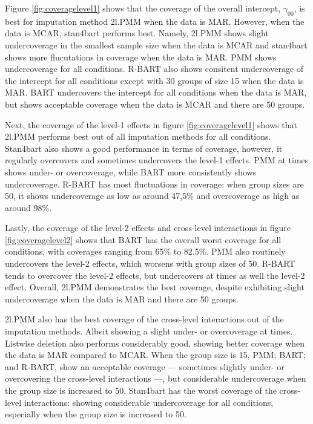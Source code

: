 \documentclass[3p,12pt,a4paper]{elsarticle}
\begin{document}
Figure \ref{fig:coveragelevel1} shows that the coverage of the overall intercept, $\gamma_{00}$, is best for imputation method 2l.PMM when the data is MAR. However, when the data is MCAR, stan4bart performs best. Namely, 2l.PMM shows slight undercoverage in the smallest sample size when the data is MCAR and stan4bart shows more flucutations in coverage when the data is MAR. PMM shows undercoverage for all conditions. R-BART also shows consitent undercoverage of the intercept for all conditions except with 30 groups of size 15 when the data is MAR. BART undercovers the intercept for all conditions when the data is MAR, but shows acceptable coverage when the data is MCAR and there are 50 groups. 

Next, the coverage of the level-1 effects in figure \ref{fig:coveragelevel1} shows that 2l.PMM performs best out of all imputation methods for all conditions. Stan4bart also shows a good performance in terms of coverage, however, it regularly overcovers and sometimes undercovers the level-1 effects. PMM at times shows under- or overcoverage, while BART more consistently shows undercoverage. R-BART has most fluctuations in coverage: when group sizes are 50, it shows undercoverage as low as around 47,5\% and overcoverage as high as around 98\%.


Lastly, the coverage of the level-2 effects and cross-level interactions in figure \ref{fig:coveragelevel2} shows that BART has the overall worst coverage for all conditions, with coverages ranging from 65\% to 82.5\%. PMM also routinely undercovers the level-2 effects, which worsens with group sizes of 50. R-BART tends to overcover the level-2 effects, but undercovers at times as well the level-2 effect. Overall, 2l.PMM demonstrates the best coverage, despite exhibiting slight undercoverage when the data is MAR and there are 50 groups. 

2l.PMM also has the best coverage of the cross-level interactions out of the imputation methods. Albeit showing a slight under- or overcoverage at times. Listwise deletion also performs considerably good, showing better coverage when the data is MAR compared to MCAR. When the group size is 15, PMM; BART; and R-BART, show an acceptable coverage --- sometimes slightly under- or overcovering the cross-level interactions ---, but considerable undercoverage when the group size is increased to 50. Stan4bart has the worst coverage of the cross-level interactions: showing considerable undercoverage for all conditions, especially when the group size is increased to 50.
\end{document}
